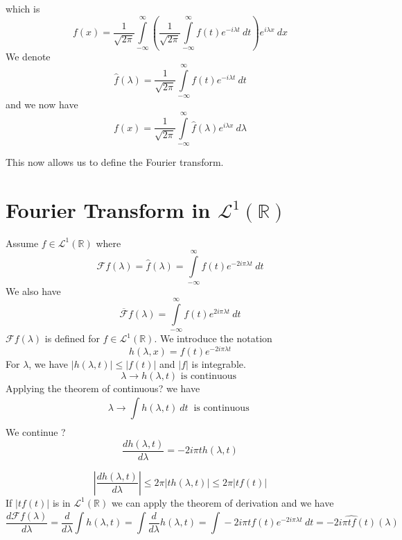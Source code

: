 which is 
\begin{equation}
    f(x) = \frac{ 1 }{ \sqrt{2\pi}  } \int\limits_{-\infty}^{\infty} \left( \frac{ 1 }{
    \sqrt{2\pi}  } \int\limits_{-\infty}^{\infty} f(t) e^{ -i\lambda t} \ dt\right) e^{
i\lambda x} \ dx 
    \label{eq:expanded}
\end{equation}
We denote 
\[
    \widehat{f}(\lambda) = \frac{ 1 }{ \sqrt{2\pi}  } \int\limits_{-\infty}^{\infty} f(t)
    e^{ -i\lambda t } \ dt 
\] 
and we now have 
\[
    f(x) = \frac{ 1 }{ \sqrt{2\pi}  } \int\limits_{-\infty}^{\infty} \widehat{f}(\lambda)
    e^{ i\lambda x} \ d\lambda 
\]

This now allows us to define the Fourier transform. 
\section{Fourier Transform in $ \mathscr{ L } ^1\left( \mathbb{R}\right)  $}
\label{sec:Fourier Transform in $ \mathscr{ L } ^1\left( \mathbb{R}\right)  $}
Assume $ f \in \mathscr{L}^1 \left( \mathbb{R}\right)  $ where 
\[
    \mathscr{ F } f\left( \lambda \right) = \widehat{f}\left( \lambda \right) =  
    \int\limits_{-\infty}^{\infty} f(t) e _{  }^{ -2i\pi
\lambda t} \ dt
\]
We also have 
\[
    \overline{\mathscr{ F }} f\left( \lambda \right) = \int\limits_{-\infty}^{\infty} f(t) 
    e _{  }^{ 2i\pi\lambda t} \ dt
\]
$ \mathscr{ F } f\left( \lambda\right)  $ is defined for $ f\in \mathscr{ L } ^1\left(
\mathbb{R}\right)  $. We introduce the notation 
\[
h(\lambda, x) = f(t) e _{  }^{ -2i\pi\lambda t } 
\]
For $ \lambda $, we have $ \left | h(\lambda, t)  \right | \leq \left | f(t)  \right |  $
and $ \left | f \right |  $ is integrable. 
\[
\lambda \to h(\lambda, t) \text{ is continuous } 
\]
Applying the theorem of continuous? we have 
\[
\lambda \to \int\limits_{ }^{ } h(\lambda, t) \ dt \ \text{ is continuous } 
\]
We continue ? 
\[
\frac{ dh(\lambda, t)  }{ d\lambda  } = -2i\pi t h(\lambda, t) 
\]

\[
\left| \frac{ dh(\lambda, t)  }{ d\lambda  } \right| \leq  2\pi\left|  t h(\lambda, t)
\right| \leq 2\pi \left | t f(t)  \right |  
\]
If $ \left | tf(t)  \right |  $ is in $ \mathscr{ L } ^1( \mathbb{R})$ we can apply the
theorem of derivation and we have 
\[
\frac{ d \mathscr{ F } f(\lambda)  }{ d\lambda  } = \frac{ d }{ d\lambda  } \int\limits_{ }^{ }  h(\lambda, t) 
= \int\limits_{ }^{ } \frac{ d }{ d\lambda  } h(\lambda, t) = \int\limits_{ }^{}-2i\pi t
f(t) e _{  }^{ -2i\pi\lambda t  } \ dt = \widehat{-2i\pi t f(t)} \left( \lambda \right)  
\]

